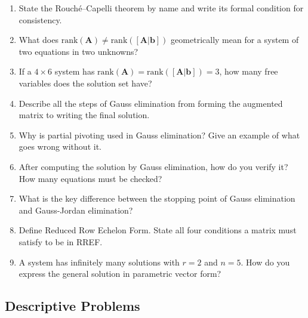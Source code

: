 \documentclass[12pt,a4paper]{article}
\begin{document}
\begin{enumerate}[leftmargin=2em, label=\textbf{V\arabic*.}]
  \item State the Rouch\'{e}--Capelli theorem by name and write its formal condition for consistency.
  \item What does $\text{rank}(\mathbf{A}) \neq \text{rank}([\mathbf{A}|\mathbf{b}])$ geometrically mean
        for a system of two equations in two unknowns?
  \item If a $4 \times 6$ system has $\text{rank}(\mathbf{A}) = \text{rank}([\mathbf{A}|\mathbf{b}]) = 3$,
        how many free variables does the solution set have?
  \item Describe all the steps of Gauss elimination from forming the augmented matrix to writing the final solution.
  \item Why is partial pivoting used in Gauss elimination? Give an example of what goes wrong without it.
  \item After computing the solution by Gauss elimination, how do you verify it? How many equations must be checked?
  \item What is the key difference between the stopping point of Gauss elimination and Gauss-Jordan elimination?
  \item Define Reduced Row Echelon Form. State all four conditions a matrix must satisfy to be in RREF.
  \item A system has infinitely many solutions with $r = 2$ and $n = 5$. How do you express the general solution in parametric vector form?
\end{enumerate}

\subsection*{Descriptive Problems}
\end{document}
